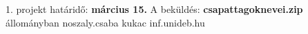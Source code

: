 1. projekt határidő: {\bf március 15.}\newline
A beküldés: {\bf csapattagoknevei.zip} állományban\newline
noszaly.csaba kukac inf.unideb.hu

